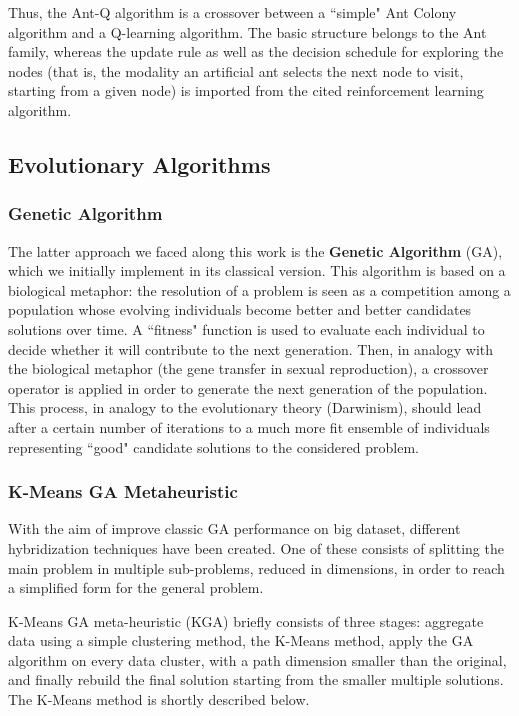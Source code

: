\documentclass[10pt]{article}
\begin{document}
Thus, the Ant-Q algorithm is a crossover between a ``simple" Ant Colony algorithm and a Q-learning algorithm. 
The basic structure belongs to the Ant family, whereas the update rule as well as the decision schedule for exploring the nodes (that is, the modality an artificial ant selects the next node to visit, starting from a given node) is imported from the cited reinforcement learning algorithm.
\subsection{Evolutionary Algorithms}
\subsubsection{Genetic Algorithm} \label{sec:gen_alg}
The latter approach we faced along this work is the \textbf{Genetic Algorithm} (GA), which we initially implement in its classical version.
This algorithm is based on a biological metaphor: the resolution of a problem is seen as a competition among a population whose evolving individuals become better and better candidates solutions over time. 
A ``fitness" function is used to evaluate each individual to decide whether it will contribute to the next
generation. 
Then, in analogy with the biological metaphor (the gene transfer in sexual reproduction), a crossover operator is applied in order to generate the next generation of the population.
This process, in analogy to the evolutionary theory (Darwinism), should lead after a certain number of iterations to a much more fit ensemble of individuals representing ``good" candidate solutions to the considered problem.

\subsubsection{K-Means GA Metaheuristic} \label{sec:KGA}
With the aim of improve classic GA performance on big dataset, different hybridization techniques have been created.
One of these consists of splitting the main problem in multiple sub-problems, reduced in dimensions, in order to reach a simplified form for the general problem.

K-Means GA meta-heuristic (KGA) briefly consists of three stages: aggregate data using a simple clustering method, the K-Means method, apply the GA algorithm on every data cluster, with a path dimension smaller than the original, and finally rebuild the final solution starting from the smaller multiple solutions.
The K-Means method is shortly described below.
\end{document}
